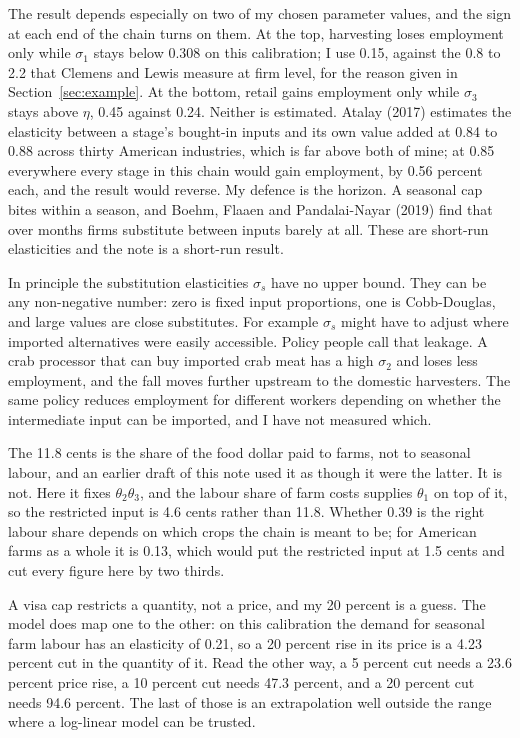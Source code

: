 \documentclass[11pt,a4paper]{article}
\begin{document}
The result depends especially on two of my chosen parameter values, and the sign at each end of the chain turns on them. At the top, harvesting loses employment only while $\sigma_1$ stays below 0.308 on this calibration; I use 0.15, against the 0.8 to 2.2 that Clemens and Lewis measure at firm level, for the reason given in Section~\ref{sec:example}. At the bottom, retail gains employment only while $\sigma_3$ stays above $\eta$, 0.45 against 0.24. Neither is estimated. Atalay (2017) estimates the elasticity between a stage's bought-in inputs and its own value added at 0.84 to 0.88 across thirty American industries, which is far above both of mine; at 0.85 everywhere every stage in this chain would gain employment, by 0.56 percent each, and the result would reverse. My defence is the horizon. A seasonal cap bites within a season, and Boehm, Flaaen and Pandalai-Nayar (2019) find that over months firms substitute between inputs barely at all. These are short-run elasticities and the note is a short-run result.

In principle the substitution elasticities $\sigma_s$ have no upper bound. They can be any non-negative number: zero is fixed input proportions, one is Cobb-Douglas, and large values are close substitutes. For example $\sigma_s$ might have to adjust where imported alternatives were easily accessible. Policy people call that leakage. A crab processor that can buy imported crab meat has a high $\sigma_2$ and loses less employment, and the fall moves further upstream to the domestic harvesters. The same policy reduces employment for different workers depending on whether the intermediate input can be imported, and I have not measured which.

The 11.8 cents is the share of the food dollar paid to farms, not to seasonal labour, and an earlier draft of this note used it as though it were the latter. It is not. Here it fixes $\theta_2 \theta_3$, and the labour share of farm costs supplies $\theta_1$ on top of it, so the restricted input is 4.6 cents rather than 11.8. Whether 0.39 is the right labour share depends on which crops the chain is meant to be; for American farms as a whole it is 0.13, which would put the restricted input at 1.5 cents and cut every figure here by two thirds.

A visa cap restricts a quantity, not a price, and my 20 percent is a guess. The model does map one to the other: on this calibration the demand for seasonal farm labour has an elasticity of 0.21, so a 20 percent rise in its price is a 4.23 percent cut in the quantity of it. Read the other way, a 5 percent cut needs a 23.6 percent price rise, a 10 percent cut needs 47.3 percent, and a 20 percent cut needs 94.6 percent. The last of those is an extrapolation well outside the range where a log-linear model can be trusted.
\end{document}
